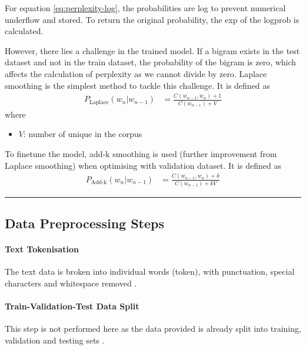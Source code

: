 For equation \ref{eq:perplexity-log}, the probabilities are log to prevent numerical underflow and stored. 
To return the original probability, the exp of the logprob is calculated.


However, there lies a challenge in the trained model. 
If a bigram exists in the test dataset and not in the train dataset, the probability of the bigram is zero, which affects the calculation of perplexity as we cannot divide by zero.
Laplace smoothing is the simplest method to tackle this challenge.
It is defined as 
\begin{align}
    P_{\text{Laplace}}(w_n | w_{n-1}) &=\frac{C(w_{n-1}, w_n) + 1}{C(w_{n-1}) + V}
\end{align}
where
\begin{itemize}
    \item $V$: number of unique in the corpus
\end{itemize}

To finetune the model, add-k smoothing is used (further improvement from Laplace smoothing) when optimising with validation dataset. 
It is defined as 
\begin{align}
    P_{\text{Add-k}}(w_n | w_{n-1}) &=\frac{C(w_{n-1}, w_n) + k}{C(w_{n-1}) + kV}
    \label{eq:additive_smoothing}
\end{align}

\hrule




\subsection*{Data Preprocessing Steps}

\paragraph{Text Tokenisation}
The text data is broken into individual words (token), with punctuation, special characters and whitespace removed \cite{web:pre-processing}.

\paragraph{Train-Validation-Test Data Split}
This step is not performed here as the data provided is already split into training, validation and testing sets \cite{web:pre-processing}.




